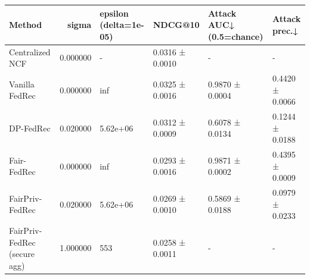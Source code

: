 \begin{tabular}{lrllll}
\toprule
Method & sigma & epsilon (delta=1e-05) & NDCG@10 & Attack AUC↓ (0.5=chance) & Attack prec.↓ \\
\midrule
Centralized NCF & 0.000000 & - & 0.0316 ± 0.0010 & - & - \\
Vanilla FedRec & 0.000000 & inf & 0.0325 ± 0.0016 & 0.9870 ± 0.0004 & 0.4420 ± 0.0066 \\
DP-FedRec & 0.020000 & 5.62e+06 & 0.0312 ± 0.0009 & 0.6078 ± 0.0134 & 0.1244 ± 0.0188 \\
Fair-FedRec & 0.000000 & inf & 0.0293 ± 0.0016 & 0.9871 ± 0.0002 & 0.4395 ± 0.0009 \\
FairPriv-FedRec & 0.020000 & 5.62e+06 & 0.0269 ± 0.0010 & 0.5869 ± 0.0188 & 0.0979 ± 0.0233 \\
FairPriv-FedRec (secure agg) & 1.000000 & 553 & 0.0258 ± 0.0011 & - & - \\
\bottomrule
\end{tabular}
